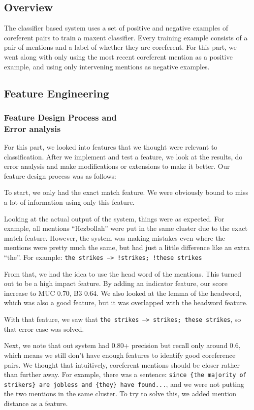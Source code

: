 \documentclass[12pt, twocolumn]{article}
\begin{document}
\subsection{Overview}
The classifier based system uses a set of positive and negative examples of coreferent pairs to train a maxent classifier. Every training example consists of a pair of mentions and a label of whether they are coreferent. For this part, we went along with only using the most recent coreferent mention as a positive example, and using only intervening mentions as negative examples. 
\subsection{Feature Engineering}
\subsubsection{Feature Design Process and\\ Error analysis}
For this part, we looked into features that we thought were relevant to classification. After we implement and test a feature, we look at the results, do error analysis and make modifications or extensions to make it better. Our feature design process was as follows:

To start, we only had the exact match feature. We were obviously bound to miss a lot of information using only this feature. 

Looking at the actual output of the system, things were as expected. For example, all mentions ``Hezbollah'' were put in the same cluster due to the exact match feature. However, the system was making mistakes even where the mentions were pretty much the same, but had just a little difference like an extra ``the''. For example: \texttt{{the strikes} -->  !{strikes}; !{these strikes}}

From that, we had the idea to use the head word of the mentions. This turned out to be a high impact feature. By adding an indicator feature, our score increase to MUC 0.70, B3 0.64. We also looked at the lemma of the headword, which was also a good feature, but it was overlapped with the headword feature.

With that feature, we saw that \texttt{{the strikes} -->  {strikes}; {these strikes}}, so that error case was solved. 

Next, we note that out system had 0.80+ precision but recall only around 0.6, which means we still don't have enough features to identify good coreference pairs. We thought that intuitively, coreferent mentions should be closer rather than further away. For example, there was a sentence: \texttt{since \{{the majority of strikers\}} are jobless and {\{they\}} have found...}, and we were not putting the two mentions in the same cluster. To try to solve this, we added mention distance as a feature.
\end{document}
